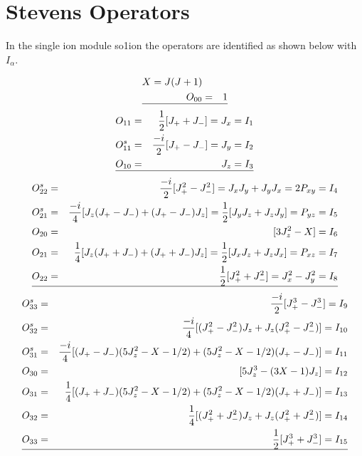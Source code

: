 \section{Stevens Operators}\label{stevens}

In the single ion
module {\prg so1ion} the operators are identified as shown below with $I_{\alpha}$.

\begin{eqnarray*}
X=J(J+1)\\
O_{00}&=&1\\
\hline
\end{eqnarray*}
\begin{eqnarray*}
O_{11}&=&\frac{1}{2}[J_++J_-]=J_x=I_1 \\
O^s_{11}&=&\frac{-i}{2}[J_+-J_-]=J_y=I_2 \\
O_{10}&=&J_z=I_3 \\
\hline
\end{eqnarray*}
\begin{eqnarray*}
O^s_{22}&=&\frac{-i}{2}[J_+^2-J_-^2]=J_xJ_y+J_yJ_x=2P_{xy}=I_4 \\
O^s_{21}&=&\frac{-i}{4}[J_z(J_+-J_-)+(J_+-J_-)J_z]=\frac{1}{2}[J_yJ_z+J_zJ_y]=P_{yz}=I_5 \\
O_{20}&=&[3J_z^2-X]=I_6 \\
O_{21}&=&\frac{1}{4}[J_z(J_++J_-)+(J_++J_-)J_z]=\frac{1}{2}[J_xJ_z+J_zJ_x]=P_{xz}=I_7 \\
O_{22}&=&\frac{1}{2}[J_+^2+J_-^2]=J_x^2-J_y^2 =I_8\\
\hline
\end{eqnarray*}
\begin{eqnarray*}
O^s_{33}&=&\frac{-i}{2}[J_+^3-J_-^3]=I_9 \\
O^s_{32}&=&\frac{-i}{4}[(J_+^2-J_-^2)J_z+J_z(J_+^2-J_-^2)]=I_{10} \\
O^s_{31}&=&\frac{-i}{4}[(J_+-J_-)(5J_z^2-X-1/2)+(5J_z^2-X-1/2)(J_+-J_-)]=I_{11} \\
O_{30}&=&[5J_z^3-(3X-1)J_z]=I_{12} \\
O_{31}&=&\frac{1}{4}[(J_++J_-)(5J_z^2-X-1/2)+(5J_z^2-X-1/2)(J_++J_-)] =I_{13}\\
O_{32}&=&\frac{1}{4}[(J_+^2+J_-^2)J_z+J_z(J_+^2+J_-^2)]=I_{14} \\
O_{33}&=&\frac{1}{2}[J_+^3+J_-^3]=I_{15} \\
\hline
\end{eqnarray*}
